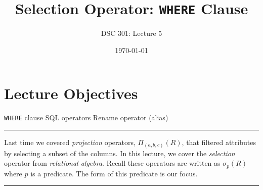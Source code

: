 \documentclass{article}
\newtheorem{definition}{Definition}
\begin{document}
\title{Selection Operator: \texttt{WHERE} Clause}
\author{DSC 301: Lecture 5}
\date{\today}
\maketitle



\begin{outline}[enumerate]

\end{outline}
\begin{outline}
        
\end{outline}



\section*{Lecture Objectives}
\begin{outline}
        \1  \texttt{WHERE} clause
        \1  SQL operators
        \1  Rename operator (alias)
\end{outline}

\hspace{-0.5cm}\rule[0.101in]{\textwidth}{0.0025in}





\noindent Last time we covered \textit{projection} operators, $\Pi_{(a,b,c)}(R)$, that filtered attributes by selecting a subset of the columns.  In this lecture, we cover the \textit{selection} operator from \textit{relational algebra}.  Recall these operators are written as $\sigma_p(R)$ where $p$ is a predicate.  The form of this predicate is our focus.   


\hspace{-0.5cm}\rule[0.101in]{\textwidth}{0.0025in}
\end{document}

